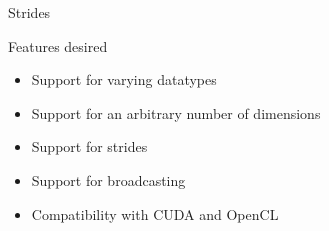 \documentclass[utf8x,xcolor=pdftex,dvipsnames,table]{beamer}
\begin{document}
\begin{frame}{Strides}
\begin{center}
\end{center}
\end{frame}

\begin{frame}{Features desired}
\begin{itemize}
\item Support for varying datatypes
\item Support for an arbitrary number of dimensions
\item Support for strides
\item Support for broadcasting
\item Compatibility with CUDA and OpenCL
\end{itemize}
\end{frame}
\end{document}
